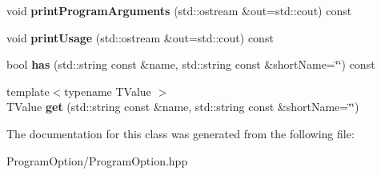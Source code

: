 \begin{DoxyCompactItemize}
$$void {\bfseries print\+Program\+Arguments} (std\+::ostream \&out=std\+::cout) const
\item 
\mbox{\label{classts_1_1_program_option_ad08d06421491f66e936f597bd4298c43}} 
void {\bfseries print\+Usage} (std\+::ostream \&out=std\+::cout) const
\item 
\mbox{\label{classts_1_1_program_option_a1fb7f75c8ac5456b83658f05530c3fb1}} 
bool {\bfseries has} (std\+::string const \&name, std\+::string const \&short\+Name=\char`\"{}\char`\"{}) const
\item 
\mbox{\label{classts_1_1_program_option_a942871d06299c44198a284761c8aa6dc}} 
{\footnotesize template$<$typename T\+Value $>$ }\\T\+Value {\bfseries get} (std\+::string const \&name, std\+::string const \&short\+Name=\char`\"{}\char`\"{})
\end{DoxyCompactItemize}


The documentation for this class was generated from the following file\+:\begin{DoxyCompactItemize}
\item 
Program\+Option/Program\+Option.\+hpp\end{DoxyCompactItemize}
